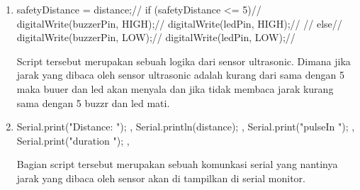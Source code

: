 \begin{enumerate}
 \item safetyDistance = distance;//
if (safetyDistance <= 5){//
  digitalWrite(buzzerPin, HIGH);//
  digitalWrite(ledPin, HIGH);//
}//
else{//
  digitalWrite(buzzerPin, LOW);//
  digitalWrite(ledPin, LOW);//
}
\par Script tersebut merupakan sebuah logika dari sensor ultrasonic. Dimana jika jarak yang dibaca oleh sensor ultrasonic adalah kurang dari sama dengan 5  maka buuer dan led akan menyala dan jika tidak membaca jarak kurang sama dengan 5 buzzr dan led mati.

\item Serial.print("Distance: "); ,
Serial.println(distance); ,
Serial.print("pulseIn "); ,
Serial.print("duration "); ,

\par Bagian script tersebut merupakan sebuah komunkasi serial yang nantinya jarak yang dibaca oleh sensor akan di tampilkan di serial monitor.
\end{enumerate}
